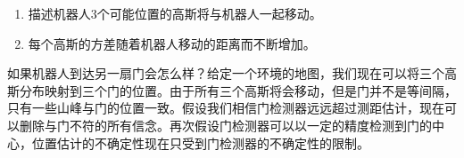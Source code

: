 \begin{enumerate}

\item 描述机器人3个可能位置的高斯将与机器人一起移动。
\item 每个高斯的方差随着机器人移动的距离而不断增加。
\end{enumerate}


如果机器人到达另一扇门会怎么样？给定一个环境的地图，我们现在可以将三个高斯分布映射到三个门的位置。由于所有三个高斯将会移动，但是门并不是等间隔，只有一些山峰与门的位置一致。假设我们相信门检测器远远超过测距估计，现在可以删除与门不符的所有信念。再次假设门检测器可以以一定的精度检测到门的中心，位置估计的不确定性现在只受到门检测器的不确定性的限制。


